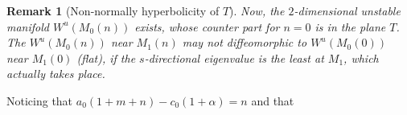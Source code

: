 \documentclass[a4paper,11pt]{article}
\newtheorem{remark}{Remark}[section]
\newtheorem{claim}{Claim}
\begin{document}
\begin{remark}[Non-normally hyperbolicity of $T$]
 Now, the $2$-dimensional unstable manifold $W^u(M_0(n))$ exists, whose counter part for $n=0$  is in the plane $T$. The $W^u(M_0(n))$ near $M_1(n)$ may not diffeomorphic to $W^u(M_0(0))$ near $M_1(0)$ (flat), if the $s$-directional eigenvalue is the least at $M_1$, which actually takes place.
\end{remark}


\pagebreak
% 
% 





Noticing that $\displaystyle a_0(1+m+n)-c_0(1+\alpha)=n$ and that
\end{document}
